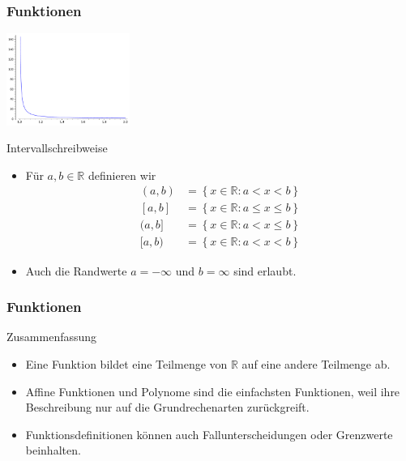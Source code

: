 \documentclass{beamer}
\newcommand\RR{\mathbb R}
\newcommand\cbc[1]{\left\{{#1}\right\}}
\renewcommand{\oe}{\"o}
\newcommand{\ue}{\"u}
\newcommand{\mytitle}{Funktionen}
\begin{document}
\begin{frame}\frametitle{\mytitle}
	\hfill\includegraphics[height=30mm]{pics/graph_zeta.pdf}
	\begin{block}{Intervallschreibweise}
		\begin{itemize}
			\item F\ue r $a,b\in\RR$ definieren wir
				\begin{align*}
					(a,b)&=\cbc{x\in\RR:a<x<b}\\
					[a,b]&=\cbc{x\in\RR:a\leq x\leq b}\\
					(a,b]&=\cbc{x\in\RR:a<x\leq b}\\
					[a,b)&=\cbc{x\in\RR:a<x<b}
				\end{align*}
			\item Auch die Randwerte $a=-\infty$ und $b=\infty$ sind erlaubt.
		\end{itemize}
	\end{block}
\end{frame}

\begin{frame}\frametitle{\mytitle}
	\begin{block}{Zusammenfassung}
		\begin{itemize}
			\item Eine Funktion bildet eine Teilmenge von $\RR$ auf eine andere Teilmenge ab.
			\item Affine Funktionen und Polynome sind die einfachsten Funktionen, weil ihre Beschreibung nur auf die Grundrechenarten zur\ue ckgreift.
			\item Funktionsdefinitionen k\oe nnen auch Fallunterscheidungen oder Grenzwerte beinhalten.
		\end{itemize}
	\end{block}
\end{frame}
\end{document}
